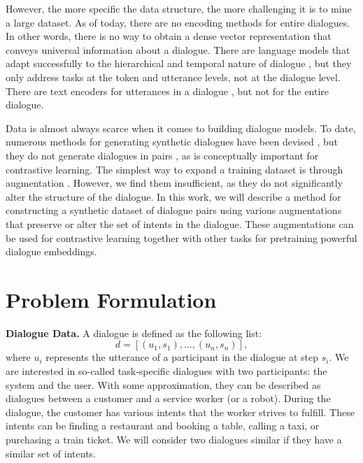 \documentclass{article}
\begin{document}
However, the more specific the data structure, the more challenging it is to mine a large dataset. As of today, there are no encoding methods for entire dialogues. In other words, there is no way to obtain a dense vector representation that conveys universal information about a dialogue. There are language models that adapt successfully to the hierarchical and temporal nature of dialogue \cite{zhang-etal-2023-dialog, li2022future}, but they only address tasks at the token and utterance levels, not at the dialogue level. There are text encoders for utterances in a dialogue \cite{henderson2020convert, Zhou2022}, but not for the entire dialogue.

Data is almost always scarce when it comes to building dialogue models. To date, numerous methods for generating synthetic dialogues have been devised \cite{kim2021neuralwoz, mohapatra2021simulated, wan-etal-2022-unified, zheng2023augesc}, but they do not generate dialogues in pairs \cite{schick2021generating}, as is conceptually important for contrastive learning. The simplest way to expand a training dataset is through augmentation \cite{soudani2023data}. However, we find them insufficient, as they do not significantly alter the structure of the dialogue. In this work, we will describe a method for constructing a synthetic dataset of dialogue pairs using various augmentations that preserve or alter the set of intents in the dialogue. These augmentations can be used for contrastive learning together with other tasks for pretraining powerful dialogue embeddings.

\section{Problem Formulation}

\textbf{Dialogue Data.} A dialogue is defined as the following list:
$$
d=[(u_1, s_1), \ldots, (u_n, s_n)],
$$
where $u_i$ represents the utterance of a participant in the dialogue at step $s_i$. We are interested in so-called task-specific dialogues with two participants: the system and the user. With some approximation, they can be described as dialogues between a customer and a service worker (or a robot). During the dialogue, the customer has various intents that the worker strives to fulfill. These intents can be finding a restaurant and booking a table, calling a taxi, or purchasing a train ticket. We will consider two dialogues similar if they have a similar set of intents.
\end{document}
